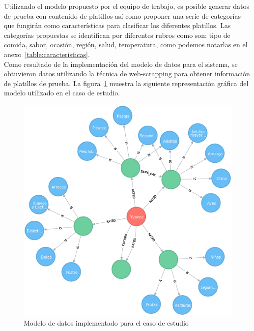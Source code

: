     Utilizando el modelo propuesto por el equipo de trabajo, es posible generar datos de prueba con contenido de platillos así como proponer una serie de categorías que fungirán como características para clasificar los diferentes platillos. Las categorías propuestas se identifican por diferentes rubros como son: tipo de comida, sabor, ocasión, región, salud, temperatura, como podemos notarlas en el anexo~\ref{table:caracteristicas}.\cite{23,24} \\

    Como resultado de la implementación del modelo de datos para el sistema, se obtuvieron datos utilizando la técnica de web-scrapping para obtener información de platillos de prueba. La figura~\ref{fig:neo4j graph} muestra la siguiente representación gráfica del modelo utilizado en el caso de estudio. 
          \begin{figure}[h!]
            \centering
            \includegraphics[width=12cm]{./images/graph}
            \caption{Modelo de datos implementado para el caso de estudio}
            \label{fig:neo4j graph}
          \end{figure}
